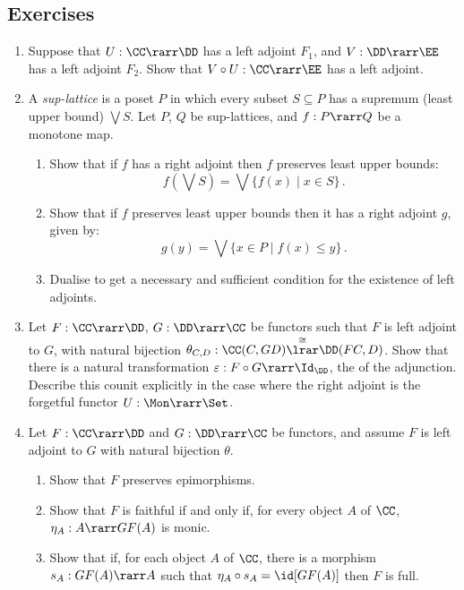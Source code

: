 \documentclass[12pt]{article}
\begin{document}
\subsection{Exercises}
\begin{enumerate}\renewcommand{\theenumi}{\textbf{\arabic{enumi}}}
  \item Suppose that $U:\CC\rarr\DD$ has a left adjoint $F_{1}$, and $V:\DD\rarr\EE$ has a left adjoint $F_{2}$. Show that
    $V\circ U:\CC\rarr \EE$ has a left adjoint.
  \item A \emph{sup-lattice} is a poset $P$ in which every subset $S \subseteq P$ has a supremum (least upper bound) $\bigvee S$.
  Let $P$, $Q$ be sup-lattices, and $f : P \rarr Q$ be a monotone map.
    \begin{enumerate}
    \item Show that if $f$ has a right adjoint then $f$ preserves least upper bounds:
    \[ f(\bigvee S) = \bigvee \{ f(x) \mid x \in S \}\,. \]
    \item Show that if $f$ preserves least upper bounds then it has a right adjoint $g$, given by:
    \[ g(y) = \bigvee \{ x \in P \mid f(x) \leq y \}\,. \]
    \item Dualise to get a necessary and sufficient condition for the existence of left adjoints.
    \end{enumerate}
  \item Let $F : \CC \rarr \DD$, $G : \DD \rarr \CC$ be functors such that $F$ is left adjoint to $G$, with natural bijection
    $\theta_{C,D}:\CC(C,GD)\overset{\cong}{\lrar}\DD(FC,D)$.
    Show that there is a natural transformation $\varepsilon : F \circ G \rarr \Id_{\DD}$, the  of the adjunction.
    \\
    Describe this counit explicitly in the case where the right adjoint is the forgetful functor $U : \Mon \rarr \Set$.
  \item Let $F:\CC\rarr\DD$ and $G:\DD\rarr\CC$ be functors, and assume $F$ is left adjoint to $G$ with natural bijection $\theta$.
    \begin{enumerate}
      \item Show that $F$ preserves epimorphisms.
      \item Show that $F$ is faithful if and only if, for every object $A$ of $\CC$, $\eta_{A}:A\rarr GF(A)$ is monic.
      \item Show that if, for each object $A$ of $\CC$, there is a morphism $s_{A}:GF(A)\rarr A$ such that
      $\eta_{A} \circ s_{A} = \id[GF(A)]$ then $F$ is full.
    \end{enumerate}
\end{enumerate}
\end{document}
